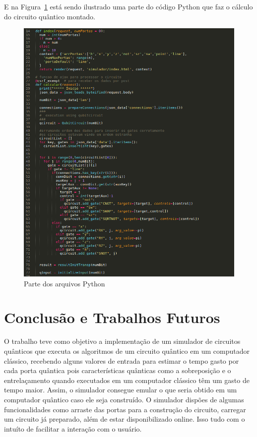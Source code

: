 \documentclass[a4paper, 12pt, oneside]{book}
\begin{document}
E na Figura~\ref{fig:resPython} está sendo ilustrado uma parte do código Python que faz o cálculo do circuito quântico montado.

\begin{figure}[H]
\centering
\includegraphics[scale=0.5]{view.png}
\caption{Parte dos arquivos Python}
\label{fig:resPython}
\end{figure}

\chapter{Conclusão e Trabalhos Futuros}
\thispagestyle{empty} 

O trabalho teve como objetivo a implementação de um simulador de circuitos quânticos que executa os algoritmos de um circuito quântico em um computador clássico, recebendo alguns valores de entrada para estimar o tempo gasto por cada porta quântica pois características quânticas como a sobreposição e o entrelaçamento quando executados em um computador clássico têm um gasto de tempo maior. Assim, o simulador consegue emular o que seria obtido em um computador quântico caso ele seja construído. O simulador dispões de algumas funcionalidades como arraste das portas para a construção do circuito, carregar um circuito já preparado, além de estar disponibilizado online. Isso tudo com o intuíto de facilitar a interação com o usuário.
\end{document}
